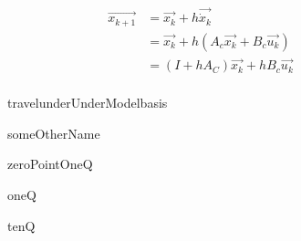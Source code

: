 \documentclass[11pt, a4paper, USenglish]{article} %
\begin{document}
\begin{align*}
    \vec{x_{k+1}} &= \vec{x_k} + h\vec{\dot{x}_k} \\
                  &= \vec{x_k} + h(A_c\vec{x_k} + B_c \vec{u_k}) \\  
                  &= (I + hA_C)\vec{x_k} + hB_c \vec{u_k} \\  
\end{align*}


\begin{figure}[H] 
        \centering
        \setlength{\figureheight}{6cm}
        \setlength{\figurewidth}{10cm}
        
        \caption{travelunderUnderModelbasis} 
\label{fig:figure4} 
\end{figure}

\begin{figure}[H] 
        \centering
        \setlength{\figureheight}{6cm}
        \setlength{\figurewidth}{10cm}
        
        \caption{someOtherName} 
\label{fig:figure5} 
\end{figure}

\begin{figure}[H] 
        \centering
        \setlength{\figureheight}{6cm}
        \setlength{\figurewidth}{10cm}
        
        \caption{zeroPointOneQ} 
\label{fig:figure3} 
\end{figure}

\begin{figure}[H] 
        \centering
        \setlength{\figureheight}{6cm}
        \setlength{\figurewidth}{10cm}
        
        \caption{oneQ} 
\label{fig:figure1}
\end{figure}

\begin{figure}[H] 
        \centering
        \setlength{\figureheight}{6cm}
        \setlength{\figurewidth}{10cm}
        
        \caption{tenQ} 
\label{fig:figure2} 
\end{figure}
\end{document}
